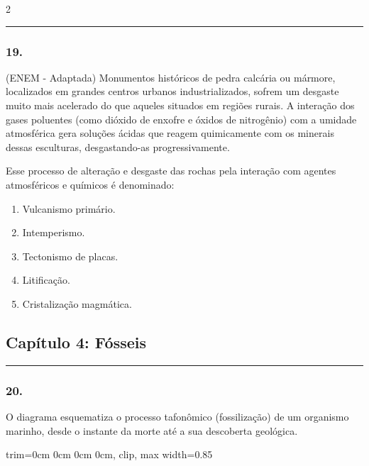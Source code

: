 \documentclass[twoside, 10pt, a4paper]{article}
\newlength{\espacoPosTitulo}
\newlength{\espacoPreQuestao}
\newlength{\espacoQuestao}
\newlength{\espacoAlt}
\newcommand{\larguraTikz}{0.85\linewidth} %
\begin{document}
\begin{multicols*}{2}
\noindent\textcolor{CorLinha}{\rule{\linewidth}{0.5pt}} 
\par\vspace{\espacoPreQuestao}
\subsubsection*{19.} (ENEM - Adaptada) Monumentos históricos de pedra calcária ou mármore, localizados em grandes centros urbanos industrializados, sofrem um desgaste muito mais acelerado do que aqueles situados em regiões rurais. A interação dos gases poluentes (como dióxido de enxofre e óxidos de nitrogênio) com a umidade atmosférica gera soluções ácidas que reagem quimicamente com os minerais dessas esculturas, desgastando-as progressivamente.

Esse processo de alteração e desgaste das rochas pela interação com agentes atmosféricos e químicos é denominado:

\begin{enumerate}[label=\alph*), itemsep=\espacoAlt]
\item Vulcanismo primário.
\item Intemperismo.
\item Tectonismo de placas.
\item Litificação.
\item Cristalização magmática.
\end{enumerate}
\par\vspace{\espacoQuestao}

\subsection*{Capítulo 4: Fósseis}
\vspace{-0.2cm}\noindent\rule{\linewidth}{1.5pt} 
\par\vspace{\espacoPosTitulo}
\subsubsection*{20.} O diagrama esquematiza o processo tafonômico (fossilização) de um organismo marinho, desde o instante da morte até a sua descoberta geológica.

\begin{center}
\begin{adjustbox}{trim=0cm 0cm 0cm 0cm, clip, max width=\larguraTikz}
\end{adjustbox}
\end{center}
\end{multicols*}
\end{document}
